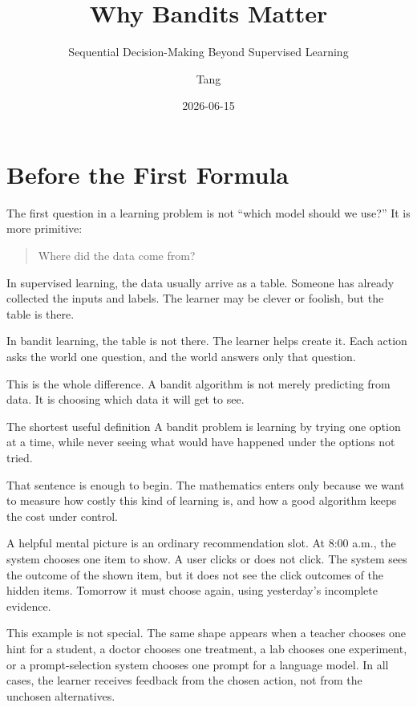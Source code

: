 \documentclass[en,nofont,11pt]{elegantbook}
\title{Why Bandits Matter}
\subtitle{Sequential Decision-Making Beyond Supervised Learning}
\author{Tang}
\institute{Tang's Machine Learning Blog}
\date{2026-06-15}
\begin{document}
\maketitle
\frontmatter
\tableofcontents
\mainmatter
\chapter*{Before the First Formula}

The first question in a learning problem is not ``which model should we use?'' It is more primitive:

\begin{quote}
Where did the data come from?
\end{quote}

In supervised learning, the data usually arrive as a table. Someone has already collected the inputs and labels. The learner may be clever or foolish, but the table is there.

In bandit learning, the table is not there. The learner helps create it. Each action asks the world one question, and the world answers only that question.

This is the whole difference. A bandit algorithm is not merely predicting from data. It is choosing which data it will get to see.

\begin{plainbox}{The shortest useful definition}
A bandit problem is learning by trying one option at a time, while never seeing what would have happened under the options not tried.
\end{plainbox}

That sentence is enough to begin. The mathematics enters only because we want to measure how costly this kind of learning is, and how a good algorithm keeps the cost under control.

A helpful mental picture is an ordinary recommendation slot. At 8:00 a.m., the system chooses one item to show. A user clicks or does not click. The system sees the outcome of the shown item, but it does not see the click outcomes of the hidden items. Tomorrow it must choose again, using yesterday's incomplete evidence.

This example is not special. The same shape appears when a teacher chooses one hint for a student, a doctor chooses one treatment, a lab chooses one experiment, or a prompt-selection system chooses one prompt for a language model. In all cases, the learner receives feedback from the chosen action, not from the unchosen alternatives.
\end{document}
